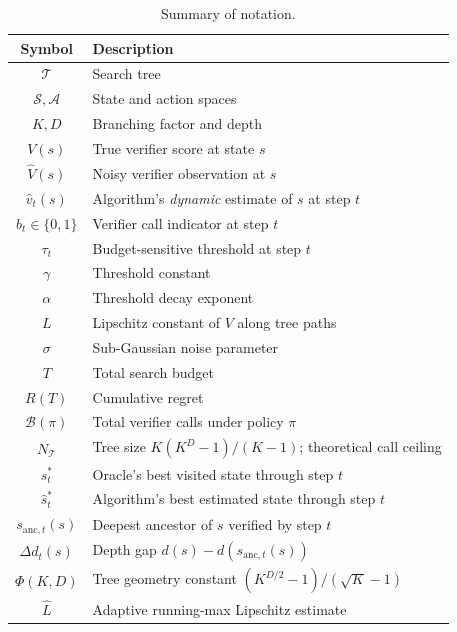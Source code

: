 \begin{table}[h]
\centering
\caption{Summary of notation.}
\label{tab:notation}
\begin{tabular}{cl}
\toprule
Symbol & Description \\
\midrule
$\mathcal{T}$ & Search tree \\
$\mathcal{S}, \mathcal{A}$ & State and action spaces \\
$K, D$ & Branching factor and depth \\
$V(s)$ & True verifier score at state $s$ \\
$\hat{V}(s)$ & Noisy verifier observation at $s$ \\
$\hat{v}_t(s)$ & Algorithm's \emph{dynamic} estimate of $s$ at step $t$ \\
$b_t \in \{0,1\}$ & Verifier call indicator at step $t$ \\
$\tau_t$ & Budget-sensitive threshold at step $t$ \\
$\gamma$ & Threshold constant \\
$\alpha$ & Threshold decay exponent \\
$L$ & Lipschitz constant of $V$ along tree paths \\
$\sigma$ & Sub-Gaussian noise parameter \\
$T$ & Total search budget \\
$R(T)$ & Cumulative regret \\
$\mathcal{B}(\pi)$ & Total verifier calls under policy $\pi$ \\
$N_{\mathcal{T}}$ & Tree size $K(K^D-1)/(K-1)$; theoretical call ceiling \\
$s^*_t$ & Oracle's best visited state through step $t$ \\
$\hat{s}^*_t$ & Algorithm's best estimated state through step $t$ \\
$s_{\mathrm{anc},t}(s)$ & Deepest ancestor of $s$ verified by step $t$ \\
$\Delta d_t(s)$ & Depth gap $d(s) - d(s_{\mathrm{anc},t}(s))$ \\
$\Phi(K,D)$ & Tree geometry constant $(K^{D/2}-1)/(\sqrt{K}-1)$ \\
$\hat{L}$ & Adaptive running-max Lipschitz estimate \\
\bottomrule
\end{tabular}
\end{table}
